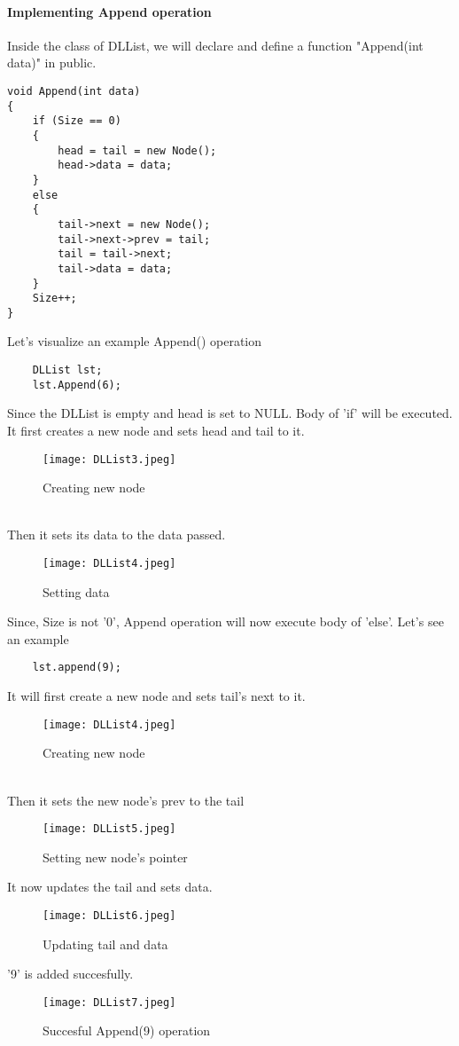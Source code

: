 \documentclass[11pt,fleqn]{book} %
\begin{document}
\paragraph{Implementing Append operation}
Inside the class of DLList, we will declare and define a function "Append(int data)" in public.
\begin{lstlisting}
void Append(int data)
{
	if (Size == 0)
	{
		head = tail = new Node();
		head->data = data;
	}
	else
	{
		tail->next = new Node();
		tail->next->prev = tail;
		tail = tail->next;
		tail->data = data;
	}
	Size++;
}

\end{lstlisting}
\begin{example}
	Let's visualize an example Append() operation\\
	\begin{lstlisting}
	DLList lst;
	lst.Append(6);
	\end{lstlisting}
	Since the DLList is empty and head is set to NULL. Body of 'if' will be executed.\\
	It first creates a new node and sets head and tail to it.\\
	\begin{figure}[H]
		\centering
		\texttt{[image: DLList3.jpeg]}
		\caption{Creating new node}
	\end{figure}
	~\\
	Then it sets its data to the data passed.
	\begin{figure}[H]
		\centering
		\texttt{[image: DLList4.jpeg]}
		\caption{Setting data}
	\end{figure}
\end{example}
Since, Size is not '0', Append operation will now execute body of 'else'. Let's see an example
\begin{example}
	\begin{lstlisting}
	lst.append(9);
	\end{lstlisting}
	It will first create a new node and sets tail's next to it.
	\begin{figure}[H]
		\centering
		\texttt{[image: DLList4.jpeg]}
		\caption{Creating new node}
	\end{figure} ~\\
	Then it sets the new node's prev to the tail
	\begin{figure}[H]
		\centering
		\texttt{[image: DLList5.jpeg]}
		\caption{Setting new node's pointer}
	\end{figure}
	It now updates the tail and sets data.
	\begin{figure}[H]
		\centering
		\texttt{[image: DLList6.jpeg]}
		\caption{Updating tail and data}
	\end{figure}
		'9' is added succesfully.
	{\begin{figure}[H]
			\centering
			\texttt{[image: DLList7.jpeg]}
			\caption{Succesful Append(9) operation}
	\end{figure}}
\end{example}
\end{document}
